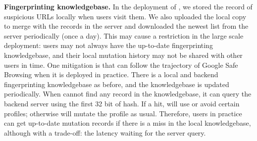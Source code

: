 \noindent
\textbf{Fingerprinting knowledgebase.}
In the deployment of \spartacus, we stored the record of suspicious URLs locally when users visit them.
We also uploaded the local copy to merge with the records in the server and downloaded the newest list from the server periodically (once a day).
This may cause a restriction in the large scale deployment: users may not always have the up-to-date fingerprinting knowledgebase, and their local mutation history may not be shared with other users in time.
One mitigation is that \spartacus can follow the trajectory of Google Safe Browsing when it is deployed in practice.
There is a local and backend fingerprinting knowledgebase as before, and the knowledgebase is updated periodically.
When \spartacus cannot find any record in the knowledgebase, it can query the backend server using the first 32 bit of hash.
If a hit, \spartacus will use or avoid certain profiles;
otherwise \spartacus will mutate the profile as usual.
Therefore, users in practice can get up-to-date mutation records if there is a miss in the local knowledgebase, although with a trade-off: the latency waiting for the server query.
